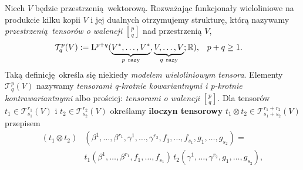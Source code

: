 Niech \(V\) będzie przestrzenią wektorową. Rozważając funkcjonały wieloliniowe na produkcie kilku kopii \(V\) i jej dualnych otrzymujemy strukturę, którą nazywamy \emph{przestrzenią tensorów o walencji} \({p \brack q}\) nad przestrzenią \(V\),
\begin{align*}
    \mathcal{T}_q^p(V) := \mathrm{L}^{p+q}(\underbrace{V^\ast, \dots, V^\ast}_{p\ \text{razy}} ,\underbrace{V,\dots, V}_{q\ \text{razy}}; \mathbb{R}) , &\quad p+q\geq 1.
\end{align*}
Taką definicję określa się niekiedy \emph{modelem wieloliniowym tensora}. Elementy \(\mathcal{T}_q^p(V)\) nazywamy \emph{tensorami q-krotnie kowariantnymi i p-krotnie kontrawariantnymi} albo prościej: \emph{tensorami o walencji} \(p \brack q\). Dla tensorów \(t_1 \in \mathcal{T}_{s_1}^{r_1}(V)\) i \(t_2 \in \mathcal{T}_{s_2}^{r_2}(V)\) określamy \textbf{iloczyn tensorowy} \(t_1 \otimes t_2 \in \mathcal{T}_{s_1+s_2}^{r_1+r_2}(V)\) przepisem 
\begin{align*}
    (t_1 \otimes t_2)& (\beta^1,\dots, \beta^{r_1}, \gamma^1, \dots, \gamma^{r_2}, f_1, \dots, f_{s_1}, g_1, \dots, g_{s_2}) = \\
                     & t_1(\beta^1,\dots, \beta^{r_1}, f_1, \dots, f_{s_1})\,t_2(\gamma^1, \dots, \gamma^{r_2},g_1, \dots, g_{s_2}),
\end{align*}
